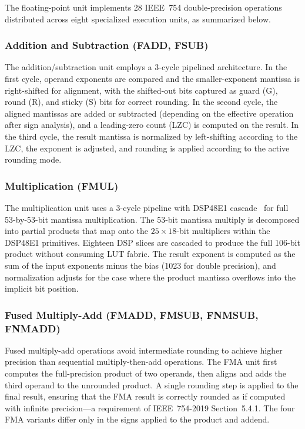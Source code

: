 \documentclass[journal]{IEEEtran}
\begin{document}
The floating-point unit implements 28 IEEE~754 double-precision
operations~\cite{ieee754_2019} distributed across eight specialized
execution units, as summarized below.

\subsubsection{Addition and Subtraction (FADD, FSUB)}
The addition/subtraction unit employs a 3-cycle
pipelined architecture.  In the first cycle, operand exponents are
compared and the smaller-exponent mantissa is right-shifted for
alignment, with the shifted-out bits captured as guard (G), round (R),
and sticky (S) bits for correct rounding.  In the second cycle, the
aligned mantissas are added or subtracted (depending on the effective
operation after sign analysis), and a leading-zero count (LZC) is
computed on the result.  In the third cycle, the result mantissa is
normalized by left-shifting according to the LZC, the exponent is
adjusted, and rounding is applied according to the active rounding mode.

\subsubsection{Multiplication (FMUL)}
The multiplication unit uses a 3-cycle pipeline with
DSP48E1 cascade~\cite{xilinx2020ds180} for full 53-by-53-bit mantissa
multiplication.  The 53-bit mantissa multiply is decomposed into partial
products that map onto the $25 \times 18$-bit multipliers within the
DSP48E1 primitives.  Eighteen DSP slices are cascaded to produce the
full 106-bit product without consuming LUT fabric.  The result exponent
is computed as the sum of the input exponents minus the bias (1023 for
double precision), and normalization adjusts for the case where the
product mantissa overflows into the implicit bit position.

\subsubsection{Fused Multiply-Add (FMADD, FMSUB, FNMSUB, FNMADD)}
Fused multiply-add operations
avoid intermediate rounding to achieve higher
precision than sequential multiply-then-add operations.  The FMA unit
first computes the full-precision product of two operands, then aligns
and adds the third operand to the unrounded product.  A single rounding
step is applied to the final result, ensuring that the FMA result is
correctly rounded as if computed with infinite precision---a requirement
of IEEE~754-2019 Section~5.4.1.  The four FMA variants differ only in
the signs applied to the product and addend.
\end{document}
